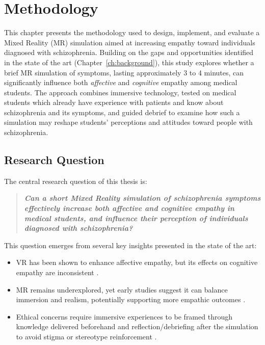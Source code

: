 \chapter{Methodology}
\label{ch:method}

This chapter presents the methodology used to design, implement, and evaluate a Mixed Reality (MR) simulation aimed at increasing empathy toward individuals diagnosed with schizophrenia. Building on the gaps and opportunities identified in the state of the art (Chapter~\ref{ch:background}), this study explores whether a brief MR simulation of symptoms, lasting approximately 3 to 4 minutes, can significantly influence both \textit{affective} and \textit{cognitive} empathy among medical students. The approach combines immersive technology, tested on medical students which already have experience with patients and know about schizophrenia and its symptoms, and guided debrief to examine how such a simulation may reshape students' perceptions and attitudes toward people with schizophrenia.

\section{Research Question}

The central research question of this thesis is:

\begin{quote}
\textit{\textbf{Can a short Mixed Reality simulation of schizophrenia symptoms effectively increase both affective and cognitive empathy in medical students, and influence their perception of individuals diagnosed with schizophrenia?}}
\end{quote}

This question emerges from several key insights presented in the state of the art:

\begin{itemize}
    \item VR has been shown to enhance affective empathy, but its effects on cognitive empathy are inconsistent \cite{Martingano2021, Ventura2020}.
    \item MR remains underexplored, yet early studies suggest it can balance immersion and realism, potentially supporting more empathic outcomes \cite{Silva2017, Krogmeier2024}.
    \item Ethical concerns require immersive experiences to be framed through knowledge delivered beforehand and reflection/debriefing after the simulation to avoid stigma or stereotype reinforcement \cite{Rueda2020, Ando2011}.
\end{itemize}

